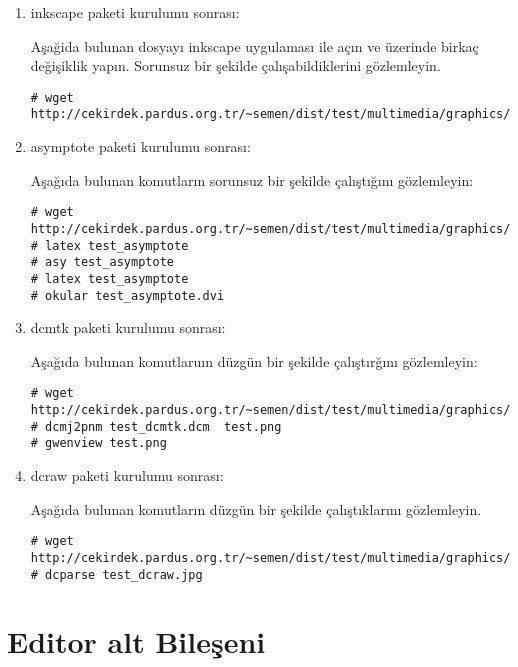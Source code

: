 \documentclass[a4paper,10pt]{article}
\begin{document}
\begin{enumerate}
\item inkscape paketi kurulumu sonrası:

Aşağida bulunan dosyayı inkscape uygulaması ile açın ve üzerinde birkaç değişiklik yapın. Sorunsuz bir şekilde çalışabildiklerini gözlemleyin.
\begin{verbatim}
# wget http://cekirdek.pardus.org.tr/~semen/dist/test/multimedia/graphics/drawing.svg 
\end{verbatim}

\item asymptote paketi kurulumu sonrası:

Aşağıda bulunan komutların sorunsuz bir şekilde çalıştığını gözlemleyin:
\begin{verbatim}
# wget http://cekirdek.pardus.org.tr/~semen/dist/test/multimedia/graphics/test_asymptote.tex
# latex test_asymptote
# asy test_asymptote
# latex test_asymptote
# okular test_asymptote.dvi
\end{verbatim}
\item  dcmtk paketi kurulumu sonrası:

Aşağıda bulunan komutlaruın düzgün bir şekilde çalıştırğını gözlemleyin:
\begin{verbatim}
# wget http://cekirdek.pardus.org.tr/~semen/dist/test/multimedia/graphics/test_dcmtk.dcm 
# dcmj2pnm test_dcmtk.dcm  test.png
# gwenview test.png
\end{verbatim}

\item dcraw paketi kurulumu sonrası:

Aşağıda bulunan komutların düzgün bir şekilde çalıştıklarını gözlemleyin.  
\begin{verbatim}
# wget http://cekirdek.pardus.org.tr/~semen/dist/test/multimedia/graphics/test_dcraw.jpg 
# dcparse test_dcraw.jpg 
\end{verbatim}

\end{enumerate}

\section{Editor alt Bileşeni}
\end{document}
